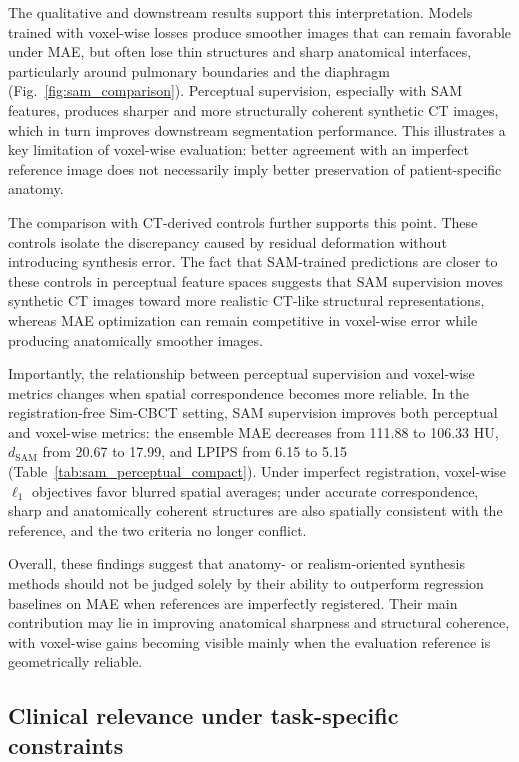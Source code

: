 \documentclass[lettersize,journal]{IEEEtran}
\begin{document}
The qualitative and downstream results support this interpretation. Models trained with voxel-wise losses produce smoother images that can remain
favorable under MAE, but often lose thin structures and sharp anatomical interfaces, particularly around pulmonary boundaries and the diaphragm (Fig.~\ref{fig:sam_comparison}). Perceptual supervision, especially with SAM features, produces sharper and more structurally coherent synthetic CT images, which in turn improves downstream segmentation performance. This illustrates a key limitation of voxel-wise evaluation: better agreement with an imperfect reference image does not necessarily imply better preservation of
patient-specific anatomy.

The comparison with CT-derived controls further supports this point. These controls isolate the discrepancy caused by residual deformation without
introducing synthesis error. The fact that SAM-trained predictions are closer to these controls in perceptual feature spaces suggests that SAM supervision moves synthetic CT images toward more realistic CT-like structural representations, whereas MAE optimization can remain competitive in
voxel-wise error while producing anatomically smoother images.

Importantly, the relationship between perceptual supervision and voxel-wise metrics changes when spatial correspondence becomes more reliable. In the registration-free Sim-CBCT setting, SAM supervision improves both perceptual and voxel-wise metrics: the ensemble MAE decreases from 111.88 to 106.33 HU, $d_{\mathrm{SAM}}$ from 20.67 to 17.99, and LPIPS from 6.15 to 5.15 (Table~\ref{tab:sam_perceptual_compact}). Under imperfect registration, voxel-wise $\ell_1$ objectives favor blurred spatial averages; under accurate correspondence, sharp and anatomically coherent structures are also spatially consistent with the reference, and the two criteria no longer conflict.

Overall, these findings suggest that anatomy- or realism-oriented synthesis methods should not be judged solely by their ability to outperform regression baselines on MAE when references are imperfectly registered. Their main contribution may lie in improving anatomical sharpness and structural coherence, with voxel-wise gains becoming visible mainly when the evaluation reference is geometrically reliable.

\subsection{Clinical relevance under task-specific constraints}
\end{document}
